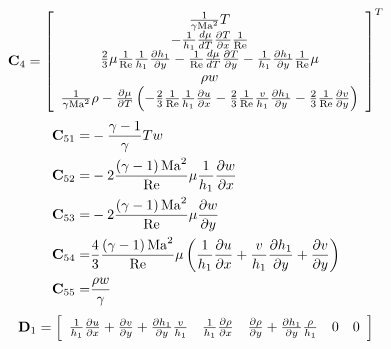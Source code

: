 \begin{equation*}
  {\bf{C}}_4  = \left[ {\begin{array}{*{20}c}
   {\frac{1}{{\gamma {\rm{Ma}}^2 }}T}  \\
   { - \frac{1}{{h_1 }}\frac{{d\mu }}{{dT}}\frac{{\partial T}}{{\partial x}}\frac{1}{{{\mathop{\rm Re}\nolimits} }}}  \\
   {\frac{2}{3}\mu \frac{1}{{{\mathop{\rm Re}\nolimits} }}\frac{1}{{h_1 }}\frac{{\partial h_1 }}{{\partial y}} - \frac{1}{{{\mathop{\rm Re}\nolimits} }}\frac{{d\mu }}{{dT}}\frac{{\partial T}}{{\partial y}} - \frac{1}{{h_1 }}\frac{{\partial h_1 }}{{\partial y}}\frac{1}{{{\mathop{\rm Re}\nolimits} }}\mu }  \\
   {\rho w}  \\
   {\frac{1}{{\gamma {\rm{Ma}}^2 }}\rho  - \frac{{\partial \mu }}{{\partial T}}\left( { - \frac{2}{3}\frac{1}{{{\mathop{\rm Re}\nolimits} }}\frac{1}{{h_1 }}\frac{{\partial u}}{{\partial x}} - \frac{2}{3}\frac{1}{{{\mathop{\rm Re}\nolimits} }}\frac{v}{{h_1 }}\frac{{\partial h_1 }}{{\partial y}} - \frac{2}{3}\frac{1}{{{\mathop{\rm Re}\nolimits} }}\frac{{\partial v}}{{\partial y}}} \right)}  \\
\end{array}} \right]^T
\end{equation*}
\begin{align*}
  {\bf{C}}_{51}  =& - \frac{{\gamma  - 1}}{\gamma }Tw\\
  {\bf{C}}_{52}  =& - 2\frac{{\left( {\gamma  - 1} \right){\rm{Ma}}^2 }}{{{\mathop{\rm Re}\nolimits} }}\mu \frac{1}{{h_1 }}\frac{{\partial w}}{{\partial x}}\\
  {\bf{C}}_{53}  =& - 2\frac{{\left( {\gamma  - 1} \right){\rm{Ma}}^2 }}{{{\mathop{\rm Re}\nolimits} }}\mu \frac{{\partial w}}{{\partial y}}\\
  {\bf{C}}_{54}  =& \frac{{\rm{4}}}{3}\frac{{\left( {\gamma  - 1} \right){\rm{Ma}}^2 }}{{{\mathop{\rm Re}\nolimits} }}\mu \left( {\frac{1}{{h_1 }}\frac{{\partial u}}{{\partial x}} + \frac{v}{{h_1 }}\frac{{\partial h_1 }}{{\partial y}} + \frac{{\partial v}}{{\partial y}}} \right)\\
  {\bf{C}}_{55}  =& \frac{{\rho w}}{\gamma }
\end{align*}
\begin{equation*}
  {\bf{D}}_1  = \left[ {\begin{array}{*{20}c}
   {\frac{1}{{h_1 }}\frac{{\partial u}}{{\partial x}} + \frac{{\partial v}}{{\partial y}} + \frac{{\partial h_1 }}{{\partial y}}\frac{v}{{h_1 }}} & {\frac{1}{{h_1 }}\frac{{\partial \rho }}{{\partial x}}} & {\frac{{\partial \rho }}{{\partial y}} + \frac{{\partial h_1 }}{{\partial y}}\frac{\rho }{{h_1 }}} & 0 & 0  \\
\end{array}} \right]
\end{equation*}
